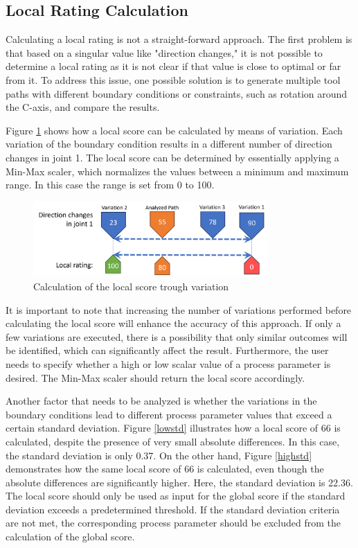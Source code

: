 \subsection{Local Rating Calculation}\label{LRC}
Calculating a local rating is not a straight-forward approach. The first problem is that based on a singular value like "direction changes," it is not possible to determine a local rating as it is not clear if that value is close to optimal or far from it.
To address this issue, one possible solution is to generate multiple tool paths with different boundary conditions or constraints, such as rotation around the C-axis, and compare the results.

Figure \ref{Localscore} shows how a local score can be calculated by means of variation. Each variation  of the boundary condition results in a different number of direction changes in joint 1. The local score can be determined by essentially applying a Min-Max scaler, which normalizes the values between a minimum and maximum range. In this case the range is set from 0 to 100.

\begin{figure}[H]
	\centerline{\includegraphics[width=0.8\textwidth]{figures/localscore.png}}
	\caption{Calculation of the local score trough variation}
	\label{Localscore}
\end{figure}

It is important to note that increasing the number of variations performed before calculating the local score will enhance the accuracy of this approach. If only a few variations are executed, there is a possibility that only similar outcomes will be identified, which can significantly affect the result. Furthermore, the user needs to specify whether a high or low scalar value of a process parameter is desired. The Min-Max scaler should return the local score accordingly. 

Another factor that needs to be analyzed is whether the variations in the boundary conditions lead to different process parameter values that exceed a certain standard deviation. Figure \ref{lowstd} illustrates how a local score of 66 is calculated, despite the presence of very small absolute differences. In this case, the standard deviation is only 0.37. On the other hand, Figure \ref{highstd} demonstrates how the same local score of 66 is calculated, even though the absolute differences are significantly higher. Here, the standard deviation is 22.36. The local score should only be used as input for the global score if the standard deviation exceeds a predetermined threshold. If the standard deviation criteria are not met, the corresponding process parameter should be excluded from the calculation of the global score.


